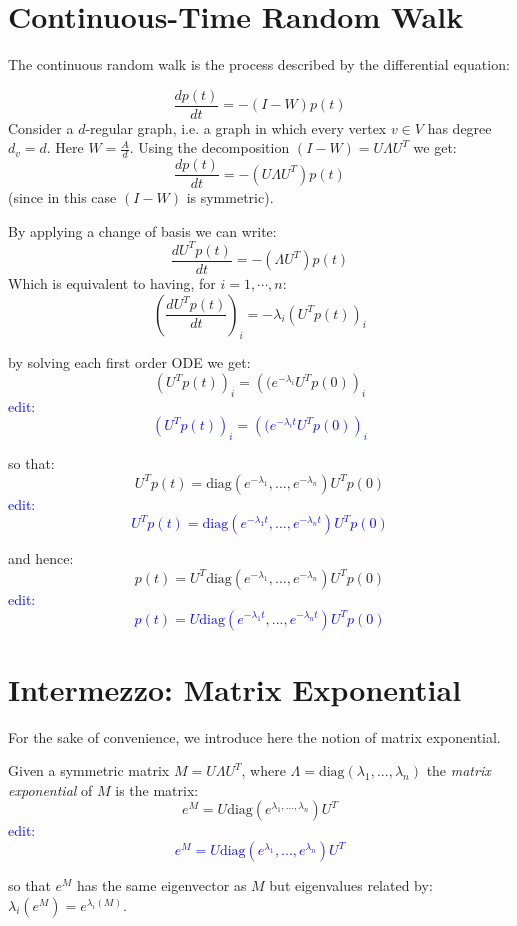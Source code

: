 \documentclass[11pt]{article}
\begin{document}

\section*{Continuous-Time Random Walk}
The continuous random walk is the process described by the differential equation:

\[
\frac{d p(t)}{dt} = -(I-W)p(t)
\]
Consider a $d$-regular graph, i.e. a graph in which every vertex $v \in V$ has degree $d_v = d$. Here $W= \frac{A}{d}$. Using the decomposition $(I-W) = U \Lambda U^T$ we get:
\[
    \frac{d p(t)}{dt} = -(U \Lambda U^T)p(t)
\]
(since in this case $(I-W)$ is symmetric).


By applying a change of basis we can write:
\[
    \frac{d U^T p(t)}{dt} = -( \Lambda U^T)p(t)
\]
Which is equivalent to having, for $i=1, \cdots, n$:
\[
    \left(\frac{dU^Tp(t)}{dt}\right)_i = - \lambda_i\left(U^Tp(t)\right)_i
\]

by solving each first order ODE we get:
\[
    \left(U^Tp(t)\right)_i = \left((e^{-\lambda_i}U^Tp(0)\right)_i
\]
\textcolor{blue}{edit:
\[
    \left(U^Tp(t)\right)_i = \left((e^{-\lambda_it}U^Tp(0)\right)_i
\]
}

so that:
\[
    U^Tp(t) = \text{diag}\left(e^{-\lambda_1}, ... , e^{-\lambda_n}\right)U^Tp(0)
\]
\textcolor{blue}{edit:
\[
    U^Tp(t) = \text{diag}\left(e^{-\lambda_1t}, ... , e^{-\lambda_nt}\right)U^Tp(0)
\]
}

and hence:
\begin{equation}\label{eqn:markov-chain1}
    p(t) = U^T\text{diag}\left(e^{-\lambda_1}, ... , e^{-\lambda_n}\right)U^Tp(0)
\end{equation}
\textcolor{blue}{edit:
\begin{equation}\label{eqn:markov-chain1}
    p(t) = U\text{diag}\left(e^{-\lambda_1t}, ... , e^{-\lambda_nt}\right)U^Tp(0)
\end{equation}
}
    
\section*{Intermezzo: Matrix Exponential}
For the sake of convenience, we introduce here the notion of matrix exponential.
\begin{definition}\label{def:matrix-exponential}
Given a symmetric matrix $M = U\Lambda U^T$, where $\Lambda =\text{diag}(\lambda_1, ... , \lambda_n)$ the \emph{matrix exponential} of $M$ is the matrix:
\[
    e^{M} = U\text{diag}(e^{\lambda_1, ... , \lambda_n})U^T
\]
\textcolor{blue}{edit:
\[
    e^{M} = U\text{diag}(e^{\lambda_1}, ... , e^{\lambda_n})U^T
\]}

so that $e^M$ has the same eigenvector as $M$ but eigenvalues related by: $\lambda_i(e^M) = e^{\lambda_i(M)}$.
\end{definition}
\end{document}
